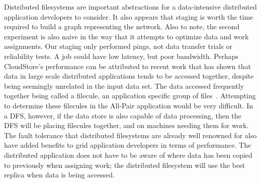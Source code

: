 \documentclass[a4paper,11pt]{article}
\begin{document}
Distributed filesystems are important abstractions for a data-intensive distributed application developers to consider. It also appears that staging is worth the time required to build a graph representing the network. Also to note, the second experiment is also naive in the way that it attempts to optimize data and work assignments. Our staging only performed pings, not data transfer trials or reliability tests. A job could have low latency, but poor bandwidth. Perhaps CloudStore's performance can be attributed to recent work that has shown that data in large scale distributed applications tends to be accessed together, despite being seemingly unrelated in the input data set. The data accessed frequently together being called a filecule, an application specific group of files~\cite{filecule}. Attempting to determine these filecules in the All-Pair application would be very difficult. In a DFS, however, if the data store is also capable of data processing, then the DFS will be placing filecules together, and on machines needing them for work. The fault tolerance that distributed filesystems are already well renowned for also have added benefits to grid application developers in terms of performance. The distributed application does not have to be aware of where data has been copied to previously when assigning work; the distributed filesystem will use the best replica when data is being accessed.

 

\end{document}
